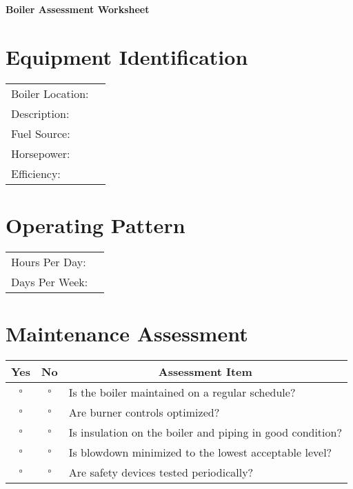 \documentclass[./main.tex]{subfiles}
\begin{document}
\begin{center}
\Large\textbf{Boiler Assessment Worksheet}
\end{center}

\section*{Equipment Identification}
\noindent\begin{tabularx}{\textwidth}{@{}lX@{}}
Boiler Location: & \hrulefill \\[2ex]
Description: & \hrulefill \\[2ex]
Fuel Source: & \hrulefill \\[2ex]
Horsepower: & \hrulefill \\[2ex]
Efficiency: & \hrulefill \\[2ex]
\end{tabularx}

\section*{Operating Pattern}
\noindent\begin{tabularx}{\textwidth}{@{}lX@{}}
Hours Per Day: & \hrulefill \\[2ex]
Days Per Week: & \hrulefill \\[2ex]
\end{tabularx}

\section*{Maintenance Assessment}
\begin{tabular}{|c|c|p{14cm}|}
\hline
\multicolumn{1}{|c|}{\textbf{Yes}} & \multicolumn{1}{c|}{\textbf{No}} & \multicolumn{1}{c|}{\textbf{Assessment Item}} \\
\hline
$\square$ & $\square$ & Is the boiler maintained on a regular schedule? \\
\hline
$\square$ & $\square$ & Are burner controls optimized? \\
\hline
$\square$ & $\square$ & Is insulation on the boiler and piping in good condition? \\
\hline
$\square$ & $\square$ & Is blowdown minimized to the lowest acceptable level? \\
\hline
$\square$ & $\square$ & Are safety devices tested periodically? \\
\hline
\end{tabular}
\end{document}
